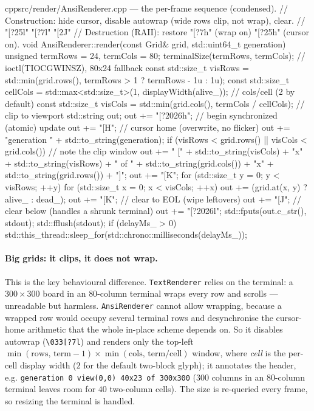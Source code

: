 \documentclass[
	english,
	letterpaper, oneside
]{article}
\begin{document}
\begin{sourcecode}{cpp}{src/render/AnsiRenderer.cpp --- the per-frame sequence (condensed).}
// Construction: hide cursor, disable autowrap (wide rows clip, not wrap), clear.
//   "[?25l"  "[?7l"  "[2J"
// Destruction (RAII): restore "[?7h" (wrap on) "[?25h" (cursor on).
void AnsiRenderer::render(const Grid& grid, std::uint64_t generation) {
  unsigned termRows = 24, termCols = 80;
  terminalSize(termRows, termCols);                      // ioctl(TIOCGWINSZ), 80x24 fallback
  const std::size_t visRows = std::min(grid.rows(), termRows > 1 ? termRows - 1u : 1u);
  const std::size_t cellCols = std::max<std::size_t>(1, displayWidth(alive_)); // cols/cell (2 by default)
  const std::size_t visCols = std::min(grid.cols(), termCols / cellCols);       // clip to viewport
  std::string out;
  out += "[?2026h";                                  // begin synchronized (atomic) update
  out += "[H";                                       // cursor home (overwrite, no flicker)
  out += "generation " + std::to_string(generation);
  if (visRows < grid.rows() || visCols < grid.cols())    // note the clip window
    out += " [" + std::to_string(visCols) + "x" + std::to_string(visRows) +
           " of " + std::to_string(grid.cols()) + "x" + std::to_string(grid.rows()) + "]";
  out += "[K\n";
  for (std::size_t y = 0; y < visRows; ++y) {
    for (std::size_t x = 0; x < visCols; ++x) out += (grid.at(x, y) ? alive_ : dead_);
    out += "[K\n";                                   // clear to EOL (wipe leftovers)
  }
  out += "[J";                                       // clear below (handles a shrunk terminal)
  out += "[?2026l";
  std::fputs(out.c_str(), stdout); std::fflush(stdout);
  if (delayMs_ > 0) std::this_thread::sleep_for(std::chrono::milliseconds(delayMs_));
}
\end{sourcecode}

\paragraph{Big grids: it clips, it does not wrap.} This is the key behavioural
difference. \texttt{TextRenderer} relies on the terminal: a $300\times300$ board
in an $80$-column terminal wraps every row and scrolls --- unreadable but
harmless. \texttt{AnsiRenderer} cannot allow wrapping, because a wrapped row
would occupy several terminal rows and desynchronise the cursor-home arithmetic
that the whole in-place scheme depends on. So it disables autowrap
(\texttt{\textbackslash 033[?7l}) and renders only the top-left
$\min(\text{rows},\,\text{term}-1)\times\min(\text{cols},\,\text{term}/\text{cell})$
window, where \emph{cell} is the per-cell display width ($2$ for the default
two-block glyph); it annotates the header, e.g. \texttt{generation 0 view(0,0)
40x23 of 300x300} ($300$ columns in an $80$-column terminal leaves room for $40$
two-column cells). The size is re-queried every frame, so resizing the terminal
is handled.
\end{document}
